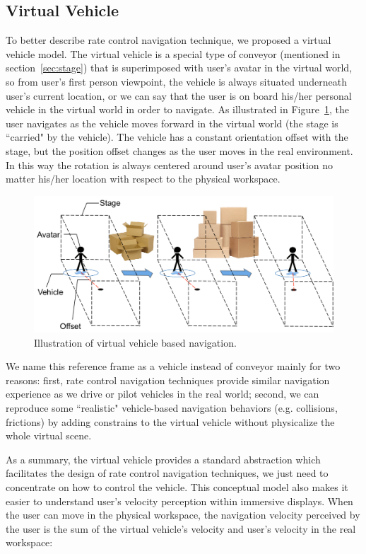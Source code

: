 \subsection{Virtual Vehicle}
To better describe rate control navigation technique, we proposed a virtual vehicle model. The virtual vehicle is a special type of conveyor (mentioned in section~\ref{sec:stage}) that is superimposed with user's avatar in the virtual world, so from user's first person viewpoint, the vehicle is always situated underneath user's current location, or we can say that the user is on board his/her personal vehicle in the virtual world in order to navigate. As illustrated in Figure~\ref{fig:2_vehicle}, the user navigates as the vehicle moves forward in the virtual world (the stage is ``carried" by the vehicle). The vehicle has a constant orientation offset with the stage, but the position offset changes as the user moves in the real environment. In this way the rotation is always centered around user's avatar position no matter his/her location with respect to the physical workspace.

\begin{figure}[htb]
  \centering
  \includegraphics[width=.8\textwidth]{figures/ch2/vehicle}
  \caption{\label{fig:2_vehicle}Illustration of virtual vehicle based navigation.}
\end{figure}

We name this reference frame as a vehicle instead of conveyor mainly for two reasons: first, rate control navigation techniques provide similar navigation experience as we drive or pilot vehicles in the real world; second, we can reproduce some ``realistic" vehicle-based navigation behaviors (e.g. collisions, frictions) by adding constrains to the virtual vehicle without physicalize the whole virtual scene.

As a summary, the virtual vehicle provides a standard abstraction which facilitates the design of rate control navigation techniques, we just need to concentrate on how to control the vehicle. This conceptual model also makes it easier to understand user's velocity perception within immersive displays. When the user can move in the physical workspace, the navigation velocity perceived by the user is the sum of the virtual vehicle's velocity and user's velocity in the real workspace: 

